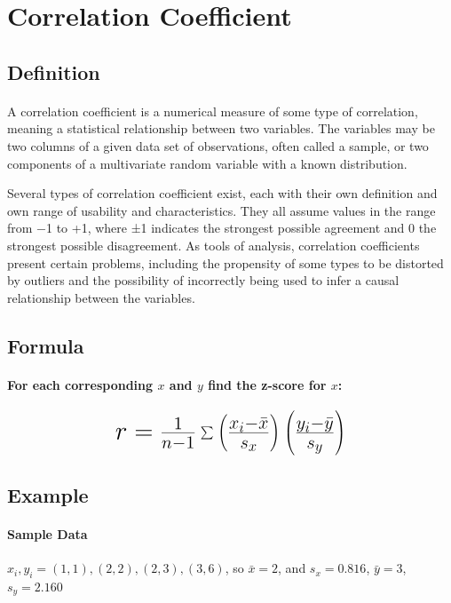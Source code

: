 \documentclass[12pt]{article}
\newcommand*{\mH}[1]{\mbox{\huge$#1$}}
\begin{document}

\section*{Correlation Coefficient}

\subsection*{Definition}
\paragraph{}%
A correlation coefficient is a numerical measure of some type of correlation, meaning a statistical relationship between two variables. The variables may be two columns of a given data set of observations, often called a sample, or two components of a multivariate random variable with a known distribution.

Several types of correlation coefficient exist, each with their own definition and own range of usability and characteristics. They all assume values in the range from −1 to +1, where ±1 indicates the strongest possible agreement and 0 the strongest possible disagreement. As tools of analysis, correlation coefficients present certain problems, including the propensity of some types to be distorted by outliers and the possibility of incorrectly being used to infer a causal relationship between the variables.

\subsection*{Formula}
\paragraph{For each corresponding $x$ and $y$ find the z-score for $x$:}
\begin{equation}
	\mH{%
		r = \frac{1}{n - 1}\sum
		\left(\frac{x_{i} - \bar{x}}{s_{x}}\right)
		\left(\frac{y_{i} - \bar{y}}{s_{y}}\right)
	}
\end{equation}%

\subsection*{Example}
\paragraph{Sample Data}
$x_{i}, y_{i} = (1, 1), (2, 2), (2, 3), (3, 6)$, so $\bar{x} = 2$, and $s_{x} = 0.816$, $\bar{y} = 3$, $s_{y} = 2.160$
\end{document}
